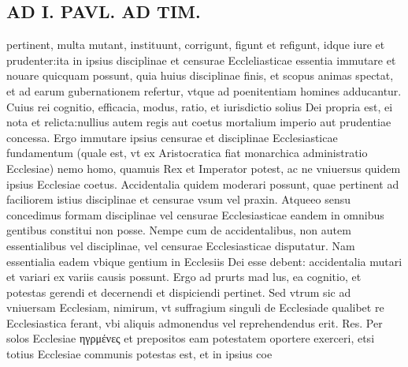 \documentclass{article}
\begin{document}
\begin{pages}
\section*{AD I. PAVL. AD TIM. }
\marginpar{[ p.244 ]}\pstart pertinent, multa mutant, instituunt, corrigunt, figunt et refigunt, idque iure et prudenter:ita in ipsius disciplinae et censurae Eccleliasticae essentia immutare et nouare quicquam possunt, quia huius disciplinae finis, et scopus animas spectat, et ad earum gubernationem refertur, vtque ad poenitentiam homines adducantur. Cuius rei cognitio, efficacia, modus, ratio, et iurisdictio solius Dei propria est, ei nota et relicta:nullius autem regis aut coetus mortalium imperio aut prudentiae concessa. Ergo immutare ipsius censurae et disciplinae Ecclesiasticae fundamentum (quale est, vt ex Aristocratica fiat monarchica administratio Ecclesiae) nemo homo, quamuis Rex et Imperator potest, ac ne vniuersus quidem ipsius Ecclesiae coetus. Accidentalia quidem moderari possunt, quae pertinent ad faciliorem istius disciplinae et censurae vsum vel praxin. Atqueeo sensu concedimus formam disciplinae vel censurae Ecclesiasticae eandem in omnibus gentibus constitui non posse. Nempe cum de accidentalibus, non autem essentialibus vel disciplinae, vel censurae Ecclesiasticae disputatur. Nam essentialia eadem vbique gentium in Ecclesiis Dei esse debent: accidentalia mutari et variari ex variis causis possunt. Ergo ad prurts mad lus, ea cognitio, et potestas gerendi et decernendi et dispiciendi pertinet. Sed vtrum sic ad vniuersam Ecclesiam, nimirum, vt suffragium singuli de Ecclesiade qualibet re Ecclesiastica ferant, vbi aliquis admonendus vel reprehendendus erit. Res. Per solos Ecclesiae ηγρμένες et prepositos eam potestatem oportere exerceri, etsi totius Ecclesiae communis potestas est, et in ipsius coe\pend

\end{pages}
\end{document}
